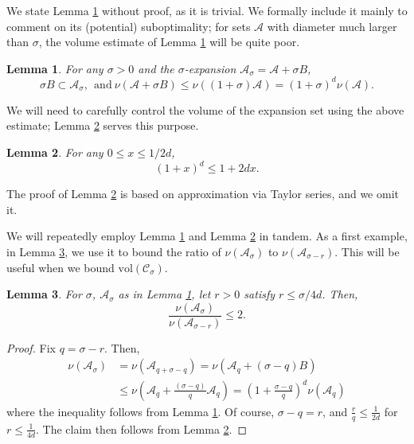 \documentclass{article}
\newcommand{\vol}{\mathrm{vol}}
\newcommand{\1}{\mathbf{1}}
\newcommand{\Cset}{\mathcal{C}}
\newcommand{\Aset}{\mathcal{A}}
\newcommand{\Asig}{\Aset_{\sigma}}
\newcommand{\Csig}{\Cset_{\sigma}}
\theoremstyle{aldenthm}
\newtheorem{lemma}{Lemma}
\begin{document}
We state Lemma \ref{lem: expansion_sets} without proof, as it is trivial. We formally include it mainly to comment on its (potential) suboptimality; for sets $\Aset$ with diameter much larger than $\sigma$, the volume estimate of Lemma \ref{lem: expansion_sets} will be quite poor. 

\begin{lemma}
	\label{lem: expansion_sets}
	For any $\sigma > 0$ and the $\sigma$-expansion $\Asig = \Aset + \sigma B$, 
	\begin{equation*}
	\sigma B \subset \Asig, ~~\mathrm{and~ }\nu(\Aset + \sigma B) \leq \nu((1 + \sigma)\Aset) = (1 + \sigma)^d \nu(\Aset).
	\end{equation*}
\end{lemma}

We will need to carefully control the volume of the expansion set using the above estimate; Lemma \ref{lem: Taylor_series} serves this purpose.
\begin{lemma}
	\label{lem: Taylor_series}
	For any $0 \leq x \leq 1/2d$,
	\begin{equation*}
	(1 + x)^d \leq 1 + 2dx.
	\end{equation*}
\end{lemma}
The proof of Lemma \ref{lem: Taylor_series} is based on approximation via Taylor series, and we omit it.

We will repeatedly employ Lemma \ref{lem: expansion_sets} and Lemma \ref{lem: Taylor_series} in tandem. As a first example, in Lemma \ref{lem: interior_of_expansion_sets}, we use it to bound the ratio of $\nu(\Asig)$ to $\nu(\Aset_{\sigma - r})$. This will be useful when we bound $\vol(\Csig)$.

\begin{lemma}
	\label{lem: interior_of_expansion_sets}
	For $\sigma$, $\Asig$ as in Lemma \ref{lem: expansion_sets}, let $r > 0$ satisfy $r \leq \sigma/4d$. Then,
	\begin{equation*}
	\frac{\nu(\Asig)}{\nu(\Aset_{\sigma - r})} \leq 2.
	\end{equation*}
\end{lemma}
\begin{proof}
	Fix $q = \sigma - r$. Then,
	\begin{align*}
	\nu(\Asig) & = \nu(\Aset_{q + \sigma - q}) = \nu(\Aset_q + (\sigma - q)B ) \\
	& \leq \nu(\Aset_q + \frac{(\sigma - q)}{q} \Aset_q) = \left(1 + \frac{\sigma - q}{q}\right)^d \nu(\Aset_q)
	\end{align*}
	where the inequality follows from Lemma \ref{lem: expansion_sets}. Of course, $\sigma - q = r$, and $\frac{r}{q} \leq \frac{1}{2d}$ for $r \leq \frac{1}{4d}$. The claim then follows from Lemma \ref{lem: Taylor_series}.
\end{proof}
\end{document}
